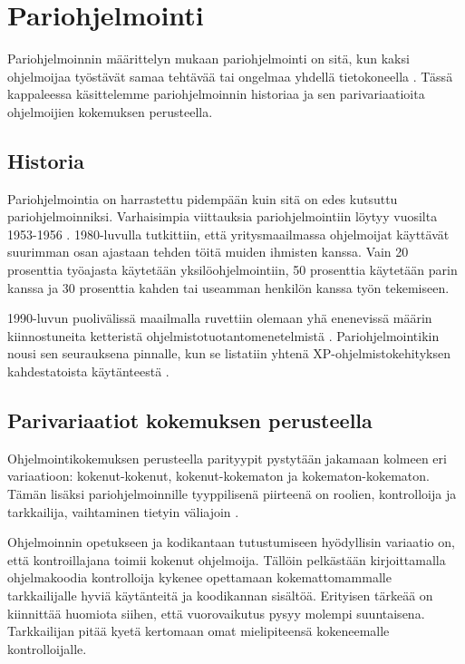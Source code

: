 \documentclass[finnish]{tktltiki2}
\theoremstyle{definition}
\theoremstyle{remark}
\begin{document}
\section{Pariohjelmointi}

Pariohjelmoinnin määrittelyn mukaan pariohjelmointi on sitä, kun kaksi ohjelmoijaa työstävät samaa tehtävää tai ongelmaa yhdellä tietokoneella \cite{nawrocki01exp}. Tässä kappaleessa käsittelemme pariohjelmoinnin historiaa ja sen parivariaatioita ohjelmoijien kokemuksen perusteella.

\subsection{Historia}

Pariohjelmointia on harrastettu pidempään kuin sitä on edes kutsuttu pariohjelmoinniksi.\cite{williams03pair} Varhaisimpia viittauksia pariohjelmointiin löytyy vuosilta 1953-1956 \cite{williams96pair}. 1980-luvulla tutkittiin, että yritysmaailmassa ohjelmoijat käyttävät suurimman osan ajastaan tehden töitä muiden ihmisten kanssa. \cite{lister87peopleware} Vain 20 prosenttia työajasta käytetään yksilöohjelmointiin, 50 prosenttia käytetään parin kanssa ja 30 prosenttia kahden tai useamman henkilön kanssa työn tekemiseen.


1990-luvun puolivälissä maailmalla ruvettiin olemaan yhä enenevissä määrin kiinnostuneita ketteristä ohjelmistotuotantomenetelmistä \cite{martin2003agile}. Pariohjelmointikin nousi sen seurauksena pinnalle, kun se listatiin yhtenä XP-ohjelmistokehityksen kahdestatoista käytänteestä \cite{beck00extreme}.

\subsection{Parivariaatiot kokemuksen perusteella}

Ohjelmointikokemuksen perusteella parityypit pystytään jakamaan kolmeen eri variaatioon: kokenut-kokenut, kokenut-kokematon ja kokematon-kokematon. Tämän lisäksi pariohjelmoinnille tyyppilisenä piirteenä on roolien, kontrolloija ja tarkkailija, vaihtaminen tietyin väliajoin \cite{williams02support}.


Ohjelmoinnin opetukseen ja kodikantaan tutustumiseen hyödyllisin variaatio on, että kontroillajana toimii kokenut ohjelmoija\cite{chong2007social}. Tällöin pelkästään kirjoittamalla ohjelmakoodia kontrolloija kykenee opettamaan kokemattomammalle tarkkailijalle hyviä käytänteitä ja koodikannan sisältöä. Erityisen tärkeää on kiinnittää huomiota siihen, että vuorovaikutus pysyy molempi suuntaisena. Tarkkailijan pitää kyetä kertomaan omat mielipiteensä kokeneemalle kontrolloijalle.
\end{document}
